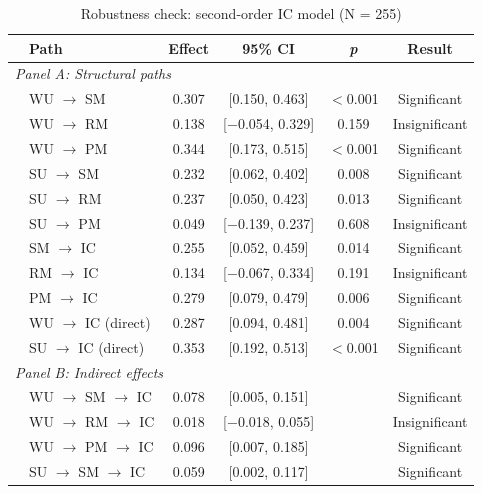 \documentclass[authoryear,preprint,review,times,10pt]{elsarticle}
\begin{document}
\begin{table}[!htbp]
\centering
\captionsetup{font=normalsize, labelsep=period}
\setlength{\abovecaptionskip}{5pt}
\setlength{\belowcaptionskip}{0pt}
\caption{Robustness check: second-order IC model (N = 255)}
\label{tab:robustness}
\small
\begin{threeparttable}
\begin{tabular*}{0.9\textwidth}{@{\extracolsep{\fill}}llcccc}
\toprule
& \textbf{Path} & \textbf{Effect} & \textbf{95\% CI} & \textbf{\textit{p}} & \textbf{Result} \\
\midrule
\multicolumn{6}{l}{\textit{Panel A: Structural paths}} \\
\midrule
& WU $\rightarrow$ SM  & 0.307 & [0.150, 0.463] & $<$0.001 & Significant \\
& WU $\rightarrow$ RM  & 0.138 & [$-$0.054, 0.329] & 0.159 & Insignificant \\
& WU $\rightarrow$ PM  & 0.344 & [0.173, 0.515] & $<$0.001 & Significant \\
& SU $\rightarrow$ SM  & 0.232 & [0.062, 0.402] & 0.008 & Significant \\
& SU $\rightarrow$ RM  & 0.237 & [0.050, 0.423] & 0.013 & Significant \\
& SU $\rightarrow$ PM  & 0.049 & [$-$0.139, 0.237] & 0.608 & Insignificant \\
& SM $\rightarrow$ IC  & 0.255 & [0.052, 0.459] & 0.014 & Significant \\
& RM $\rightarrow$ IC  & 0.134 & [$-$0.067, 0.334] & 0.191 & Insignificant \\
& PM $\rightarrow$ IC  & 0.279 & [0.079, 0.479] & 0.006 & Significant \\
& WU $\rightarrow$ IC (direct) & 0.287 & [0.094, 0.481] & 0.004 & Significant \\
& SU $\rightarrow$ IC (direct) & 0.353 & [0.192, 0.513] & $<$0.001 & Significant \\
\midrule
\multicolumn{6}{l}{\textit{Panel B: Indirect effects}} \\
\midrule
& WU $\rightarrow$ SM $\rightarrow$ IC & 0.078 & [0.005, 0.151] & & Significant \\
& WU $\rightarrow$ RM $\rightarrow$ IC & 0.018 & [$-$0.018, 0.055] & & Insignificant \\
& WU $\rightarrow$ PM $\rightarrow$ IC & 0.096 & [0.007, 0.185] & & Significant \\
& SU $\rightarrow$ SM $\rightarrow$ IC & 0.059 & [0.002, 0.117] & & Significant \\

\end{tabular*}
\end{threeparttable}
\end{table}
\end{document}
